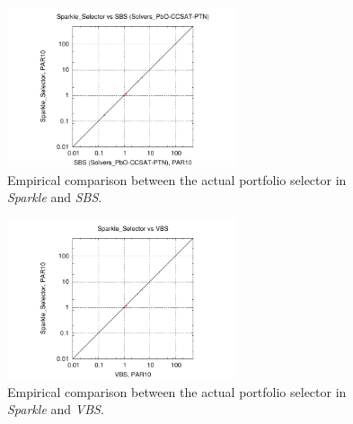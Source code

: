 \documentclass[british]{article}
\begin{document}
%

\begin{figure}[htbp]
\noindent \begin{centering}
\includegraphics[width=0.6\textwidth]{figure_portfolio_selector_sparkle_vs_sbs}
\par\end{centering}

\caption{Empirical comparison between the actual portfolio selector in \emph{Sparkle} and \emph{SBS}.}\label{fig:sparkle_vs_sbs}
\end{figure}

\begin{figure}[htbp]
\noindent \begin{centering}
\includegraphics[width=0.6\textwidth]{figure_portfolio_selector_sparkle_vs_vbs}
\par\end{centering}

\caption{Empirical comparison between the actual portfolio selector in \emph{Sparkle} and \emph{VBS}.}\label{fig:sparkle_vs_vbs}
\end{figure}





\end{document}
